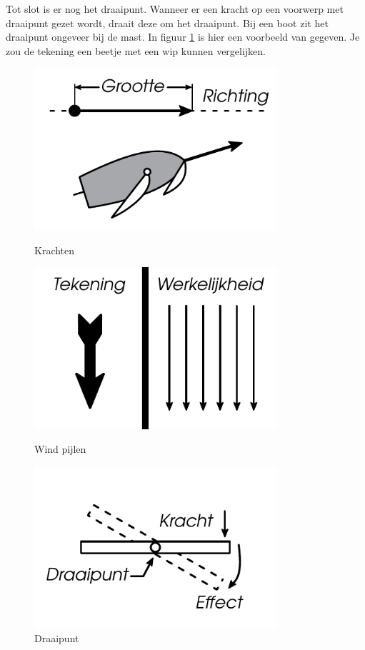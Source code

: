 Tot slot is er nog het draaipunt. Wanneer er een kracht op een voorwerp met draaipunt gezet wordt, draait deze om het draaipunt. Bij een boot zit het draaipunt ongeveer bij de mast. In figuur \ref{pic:draaipunt} is hier een voorbeeld van gegeven. Je zou de tekening een beetje met een wip kunnen vergelijken.
\begin{figure}[h]
  \centering
  \begin{minipage}[b]{0.32\textwidth}
  \centering
    \includegraphics[width=0.8\textwidth]{../Hoofdstukken/Krachten/pdf/krachten.pdf}
    \caption{Krachten}
    \label{pic:kracht}
  \end{minipage}
  \hfill
  \begin{minipage}[b]{0.32\textwidth}
    \centering
    \includegraphics[width=0.8\textwidth]{Hoofdstukken/Krachten/pdf/wind.pdf}
    \caption{Wind pijlen}
    \label{pic:wind_pijl}
    \end{minipage}
  \hfill
  \begin{minipage}[b]{0.32\textwidth}
    \centering
    \includegraphics[width=0.8\textwidth]{Hoofdstukken/Krachten/pdf/draaipunt.pdf}
    \caption{Draaipunt}
    \label{pic:draaipunt}
  \end{minipage}
\end{figure}
